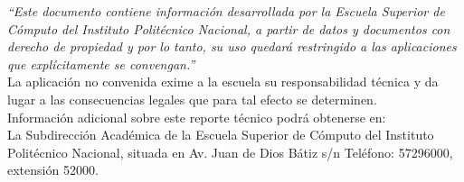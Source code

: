 \filright
\begin{minipage}{\textwidth}
    \filright
    \centering
    \begin{tcolorbox}[enhanced,attach boxed title to top center={yshift=-3mm,yshifttext=-1mm},
      colback=blue!5!white,colframe=blue!75!black,colbacktitle=red!80!black,
      title=\textbf{Advertencia},fonttitle=\bfseries,
      boxed title style={size=small,colframe=red!50!black} ]
    \textit{“Este documento contiene información desarrollada por la Escuela
    Superior de Cómputo del Instituto Politécnico Nacional, a partir de datos y
    documentos con derecho de propiedad y por lo tanto, su uso quedará
    restringido a las aplicaciones que explícitamente se convengan.”}\\
    
    La aplicación no convenida exime a la escuela su responsabilidad técnica y
    da lugar a las consecuencias legales que para tal efecto se determinen.\\
    
    Información adicional sobre este reporte técnico podrá obtenerse en:\\
    
    La Subdirección Académica de la Escuela Superior de Cómputo del Instituto
    Politécnico Nacional, situada en Av. Juan de Dios Bátiz s/n Teléfono: 57296000, extensión 52000.
    \end{tcolorbox}
\end{minipage}